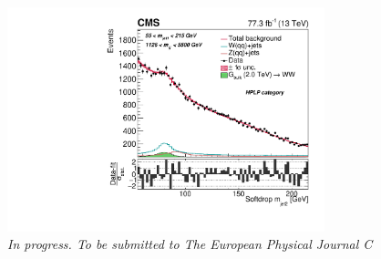 \begin{figure}[h!]
    \centering
    \vspace*{10mm}
    \includegraphics[height=6.5cm]{figures/analysis/search3/B2G-18-002/PostFitComboHPLP_Y-Proj__x___0_-1_z___0_-1.pdf}
    \vspace*{10mm}
    \caption*{\footnotesize{\textit{In progress. To be submitted to The European Physical Journal C}}}
\end{figure}

\clearpage




